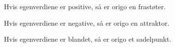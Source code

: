 Hvis egenverdiene er positive, så er origo en frastøter.

Hvis egenverdiene er negative, så er origo en attraktor.

Hvis egenverdiene er blandet, så er origo et sadelpunkt.
